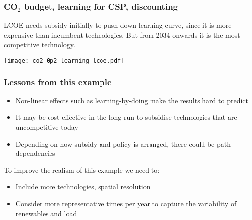 \documentclass[10pt,aspectratio=169,dvipsnames]{beamer}
\let\olditem\item
\renewcommand{\item}{%
\olditem\vspace{5pt}}
\begin{document}
\begin{frame}
  \frametitle{CO$_2$ budget, learning for CSP, discounting}

  LCOE needs subsidy initially to push down learning curve, since it is more expensive than incumbent technologies. But from 2034 onwards it is the most competitive technology.

  \centering
  \texttt{[image: co2-0p2-learning-lcoe.pdf]}

\end{frame}

\begin{frame}
  \frametitle{Lessons from this example}

  \begin{itemize}
  \item Non-linear effects such as learning-by-doing make the results hard to predict
  \item It may be cost-effective in the long-run to subsidise technologies that are uncompetitive today
  \item Depending on how subsidy and policy is arranged, there could be \alert{path dependencies}
  \end{itemize}

  To improve the realism of this example we need to:
  \begin{itemize}
  \item Include more technologies, spatial resolution
  \item Consider more representative times per year to capture the variability of renewables and load
  \end{itemize}

\end{frame}
\end{document}
